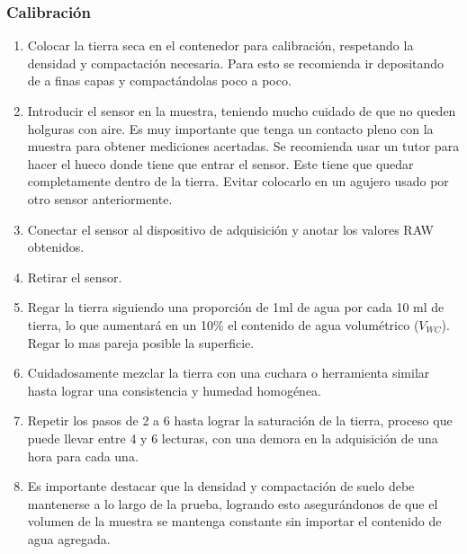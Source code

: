 \subsubsection{Calibración}

\begin{enumerate}

    \item Colocar la tierra seca en el contenedor para calibración, respetando la densidad y compactación necesaria. Para esto se recomienda ir depositando de a finas capas y compactándolas poco a poco.
    
    \item Introducir el sensor en la muestra, teniendo mucho cuidado de que no queden holguras con aire. Es muy importante que tenga un contacto pleno con la muestra para obtener mediciones acertadas. Se recomienda usar un tutor para hacer el hueco donde tiene que entrar el sensor. Este tiene que quedar completamente dentro de la tierra. Evitar colocarlo en un agujero usado por otro sensor anteriormente.
    \item Conectar el sensor al dispositivo de adquisición y anotar los valores RAW obtenidos.
    \item Retirar el sensor.
    \item Regar la tierra siguiendo una proporción de 1ml de agua por cada 10 ml de tierra, lo que aumentará en un 10\% el contenido de agua volumétrico ($V_{WC}$). Regar lo mas pareja posible la superficie.
    \item Cuidadosamente mezclar la tierra con una cuchara o herramienta similar hasta lograr una consistencia y humedad homogénea.
    \item Repetir los pasos de 2 a 6 hasta lograr la saturación de la tierra, proceso que puede llevar entre 4 y 6 lecturas, con una demora en la adquisición de una hora para cada una.
    \item Es importante destacar que la densidad y compactación de suelo debe mantenerse a lo largo de la prueba, logrando esto asegurándonos de que el volumen de la muestra se mantenga constante sin importar el contenido de agua agregada.
    
\end{enumerate}

